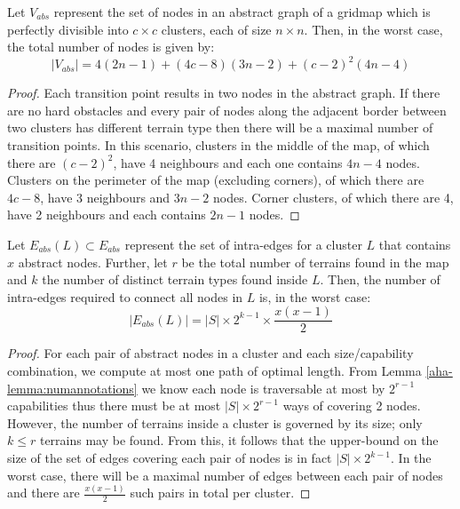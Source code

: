 \begin{lemma}
\label{aha-lemma:maxnodes}
Let $V_{abs}$ represent the set of nodes in an abstract graph of a gridmap which is perfectly divisible into $c \times c$ clusters, each of size $n \times n$. Then, in the worst case, the total number of nodes is given by:
$$|V_{abs}| = 4(2n-1) + (4c - 8)(3n-2) + (c-2)^2(4n-4)$$
\end{lemma}

\begin{proof}
Each transition point results in two nodes in the abstract graph. 
If there are no hard obstacles and every pair of nodes along the adjacent border between two clusters has different terrain type then there will be a maximal number of transition points. 
In this scenario, clusters in the middle of the map, of which there are $(c-2)^2$, have 4 neighbours and each one contains $4n-4$ nodes. 
Clusters on the perimeter of the map (excluding corners), of which there are $4c-8$, have 3 neighbours and $3n-2$ nodes. 
Corner clusters, of which there are 4, have 2 neighbours and each contains $2n-1$ nodes.
\end{proof}

\begin{lemma}
\label{aha-lemma:maxedgesincluster}
Let $E_{abs}(L) \subset E_{abs}$ represent the set of intra-edges for a cluster $L$ that contains $x$ abstract nodes. Further, let $r$ be the total number of terrains found in the map and $k$ the number of distinct terrain types found inside $L$. Then, the number of intra-edges required to connect all nodes in $L$ is, in the worst case:
 $$|E_{abs}(L)| = |S|\times 2^{k-1} \times \frac{x(x-1)}{2}$$
 \end{lemma}

\begin{proof}
For each pair of abstract nodes in a cluster and each size/capability combination, we compute at most one path of optimal length. 
From Lemma \ref{aha-lemma:numannotations} we know each node is traversable at most by $2^{r-1}$ capabilities thus there must be at most $|S|\times 2^{r-1}$ ways of covering 2 nodes. 
However, the number of terrains inside a cluster is governed by its size; only $k \leq r$ terrains may be found. 
From this, it follows that the upper-bound on the size of the set of edges covering each pair of nodes is in fact $|S| \times 2^{k-1}$. 
In the worst case, there will be a maximal number of edges between each pair of nodes and there are $\frac{x(x-1)}{2}$ such pairs in total per cluster. 
\end{proof}

